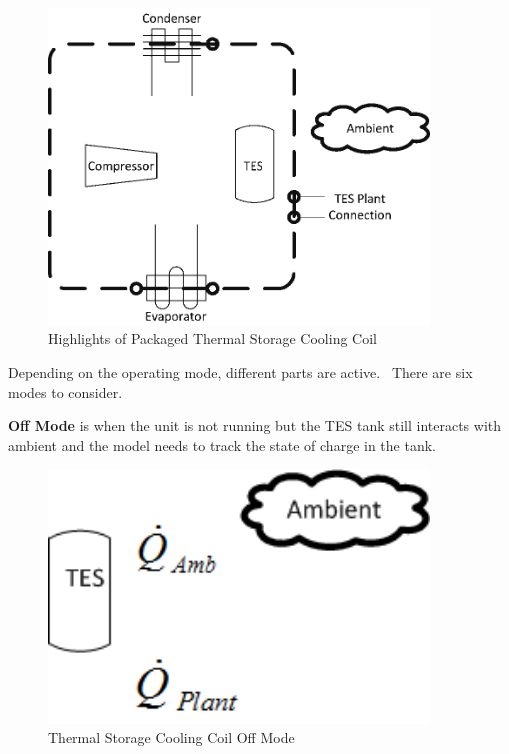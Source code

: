 \begin{figure}[hbtp] %
\centering
\includegraphics[width=0.9\textwidth, height=0.9\textheight, keepaspectratio=true]{media/image4287.png}
\caption{Highlights of Packaged Thermal Storage Cooling Coil \protect \label{fig:highlights-of-packaged-thermal-storage}}
\end{figure}

Depending on the operating mode, different parts are active.~ There are six modes to consider.

\textbf{Off Mode} is when the unit is not running but the TES tank still interacts with ambient and the model needs to track the state of charge in the tank.

\begin{figure}[hbtp] %
\centering
\includegraphics[width=0.9\textwidth, height=0.9\textheight, keepaspectratio=true]{media/image4288.png}
\caption{Thermal Storage Cooling Coil Off Mode \protect \label{fig:thermal-storage-cooling-coil-off-mode}}
\end{figure}

